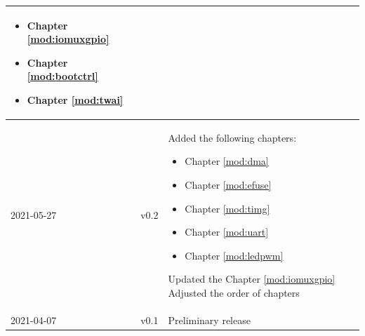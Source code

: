 \begin{longtable}[l]{ | m{2cm} | m{1.5cm} | m{12cm} | }
\begin{itemize}
                \item Chapter \ref{mod:iomuxgpio} \textit{\nameref{mod:iomuxgpio}}
                \item Chapter \ref{mod:bootctrl} \textit{\nameref{mod:bootctrl}}
                \item Chapter \ref{mod:twai} \textit{\nameref{mod:twai}}
            \end{itemize} \\\hline
        2021-05-27 & v0.2 &
        Added the following chapters:
            \begin{itemize}
                \item Chapter \ref{mod:dma} \textit{\nameref{mod:dma}}
                \item Chapter \ref{mod:efuse} \textit{\nameref{mod:efuse}}
                \item Chapter \ref{mod:timg} \textit{\nameref{mod:timg}}
                \item Chapter \ref{mod:uart} \textit{\nameref{mod:uart}}
                \item Chapter \ref{mod:ledpwm} \textit{\nameref{mod:ledpwm}}
            \end{itemize}
        Updated the Chapter \ref{mod:iomuxgpio} \textit{\nameref{mod:iomuxgpio}}
        Adjusted the order of chapters \\\hline

        2021-04-07 & v0.1 & Preliminary release \\\hline
\end{longtable}
